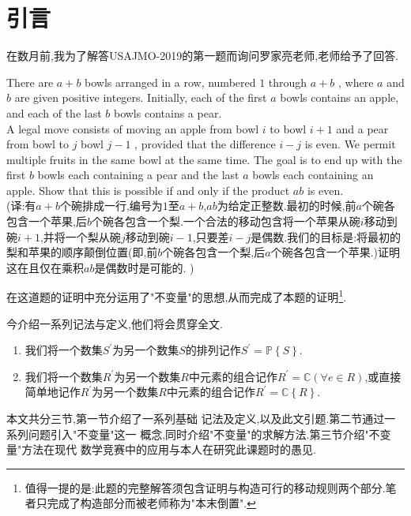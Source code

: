 \section{引言}
    在数月前,我为了解答USAJMO-2019的第一题而询问罗家亮老师,老师给予了回答.
    \begin{problema}
        There are $a+b$ bowls arranged in a row, numbered $1$ through $a+b$ , where $a$ and  $b$ are given positive integers. Initially, each of the first $a$ bowls contains an apple, and each of the last $b$ bowls contains a pear.\\
		A legal move consists of moving an apple from bowl $i$ to bowl $i+1$ and a pear from bowl  to $j$ bowl $j-1$ , provided that the difference $i-j$ is even. We permit multiple fruits in the same bowl at the same time. The goal is to end up with the first $b$ bowls each containing a pear and the last $a$ bowls each containing an apple. Show that this is possible if and only if the product $ab$ is even.\\
		(译:有$a+b$个碗排成一行,编号为$1$至$a+b$,$a$$b$为给定正整数.最初的时候,前$a$个碗各包含一个苹果,后$b$个碗各包含一个梨.一个合法的移动包含将一个苹果从碗$i$移动到碗$i+1$,并将一个梨从碗$j$移动到碗$i-1$,只要差$i-j$是偶数.我们的目标是:将最初的梨和苹果的顺序颠倒位置(即,前$b$个碗各包含一个梨,后$a$个碗各包含一个苹果.)证明这在且仅在乘积$ab$是偶数时是可能的.
        )
		\label{pbl:ini}
    \end{problema}
    在这道题的证明中充分运用了"不变量"的思想,从而完成了本题的证明\footnote{值得一提的是:此题的完整解答须包含证明与构造可行的移动规则两个部分.笔者只完成了构造部分而被老师称为"本末倒置".}.
   
    今介绍一系列记法与定义,他们将会贯穿全文.
    \begin{enumerate}
        
        \item 我们将一个数集$S^{\prime}$为另一个数集$S$的排列记作$S^{\prime}=\mathbb{P}\left\{S\right\}.$
        \item 我们将一个数集$R^{\prime}$为另一个数集$R$中元素的组合记作$R^{\prime}=\mathbb{C}(\forall{e}\in R)$,或直接简单地记作$R^{\prime}$为另一个数集$R$中元素的组合记作$R^{\prime}=\mathbb{C}\left\{R\right\}.$
    \end{enumerate}

    本文共分三节,第一节介绍了一系列基础
        记法及定义,以及此文引题.第二节通过一系列问题引入"不变量"这一
        概念,同时介绍"不变量"的求解方法.第三节介绍"不变量"方法在现代
        数学竞赛中的应用与本人在研究此课题时的愚见.
    